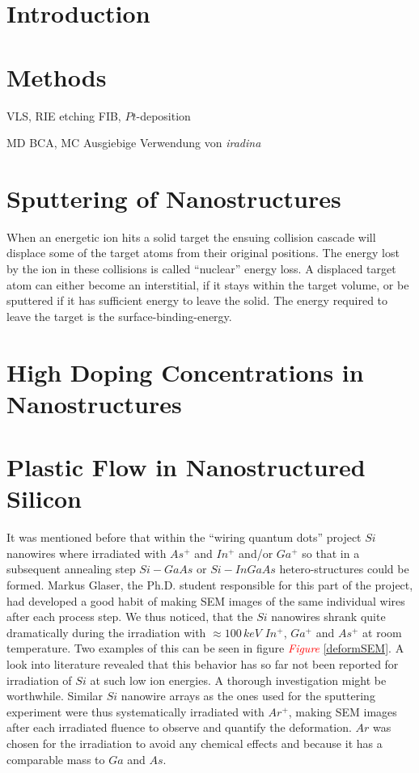 \documentclass[12pt,
paper=a4,				
DIV=calc,		  %
BCOR=16mm,	  %
headinclude,
openany
]{scrbook}
\newcommand{\TODO}[1]{{\LARGE{\textcolor{red}{\emph {#1 }}}}}
\begin{document}
%

\tableofcontents

\chapter{Introduction}
\setcounter{page}{1}

%


\chapter{Methods}

VLS, RIE etching
FIB, $Pt$-deposition

MD
BCA, MC
Ausgiebige Verwendung von \emph{iradina} \cite{borschel_ion_2011}

\chapter{Sputtering of Nanostructures}


When an energetic ion hits a solid target the ensuing collision cascade will displace some of the target atoms from their original positions. The energy lost by the ion in these collisions is called ``nuclear'' energy loss. A displaced target atom can either become an interstitial, if it stays within the target volume, or be sputtered if it has sufficient energy to leave the solid. The energy required to leave the target is the surface-binding-energy.

\chapter{High Doping Concentrations in Nanostructures}


\chapter{Plastic Flow in Nanostructured Silicon}

It was mentioned before that within the ``wiring quantum dots'' project $Si$ nanowires where irradiated with $As^+$ and $In^+$ and/or $Ga^+$ so that in a subsequent annealing step $Si-GaAs$ or $Si-InGaAs$ hetero-structures could be formed. Markus Glaser, the Ph.D. student responsible for this part of the project, had developed a good habit of making SEM images of the same individual wires after each process step. We thus noticed, that the $Si$ nanowires shrank quite dramatically during the irradiation with $\approx 100\,keV$ $In^+$, $Ga^+$ and $As^+$ at room temperature. Two examples of this can be seen in figure \TODO{Figure}\ref{deformSEM}. A look into literature revealed that this behavior has so far not been reported for irradiation of $Si$ at such low ion energies. A thorough investigation might be worthwhile. Similar $Si$ nanowire arrays as the ones used for the sputtering experiment were thus systematically irradiated with $Ar^+$, making SEM images after each irradiated fluence to observe and quantify the deformation. $Ar$ was chosen for the irradiation to avoid any chemical effects and because it has a comparable mass to $Ga$ and $As$.
 
\end{document}
